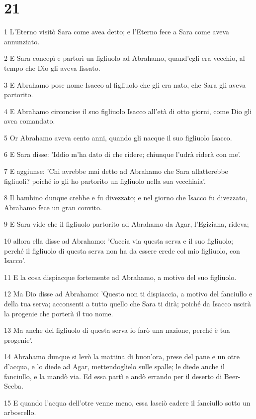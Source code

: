 \chapter{21}

\par 1 L'Eterno visitò Sara come avea detto; e l'Eterno fece a Sara come aveva annunziato.
\par 2 E Sara concepì e partorì un figliuolo ad Abrahamo, quand'egli era vecchio, al tempo che Dio gli aveva fissato.
\par 3 E Abrahamo pose nome Isacco al figliuolo che gli era nato, che Sara gli aveva partorito.
\par 4 E Abrahamo circoncise il suo figliuolo Isacco all'età di otto giorni, come Dio gli avea comandato.
\par 5 Or Abrahamo aveva cento anni, quando gli nacque il suo figliuolo Isacco.
\par 6 E Sara disse: 'Iddio m'ha dato di che ridere; chiunque l'udrà riderà con me'.
\par 7 E aggiunse: 'Chi avrebbe mai detto ad Abrahamo che Sara allatterebbe figliuoli? poiché io gli ho partorito un figliuolo nella sua vecchiaia'.
\par 8 Il bambino dunque crebbe e fu divezzato; e nel giorno che Isacco fu divezzato, Abrahamo fece un gran convito.
\par 9 E Sara vide che il figliuolo partorito ad Abrahamo da Agar, l'Egiziana, rideva;
\par 10 allora ella disse ad Abrahamo: 'Caccia via questa serva e il suo figliuolo; perché il figliuolo di questa serva non ha da essere erede col mio figliuolo, con Isacco'.
\par 11 E la cosa dispiacque fortemente ad Abrahamo, a motivo del suo figliuolo.
\par 12 Ma Dio disse ad Abrahamo: 'Questo non ti dispiaccia, a motivo del fanciullo e della tua serva; acconsenti a tutto quello che Sara ti dirà; poiché da Isacco uscirà la progenie che porterà il tuo nome.
\par 13 Ma anche del figliuolo di questa serva io farò una nazione, perché è tua progenie'.
\par 14 Abrahamo dunque si levò la mattina di buon'ora, prese del pane e un otre d'acqua, e lo diede ad Agar, mettendoglielo sulle spalle; le diede anche il fanciullo, e la mandò via. Ed essa partì e andò errando per il deserto di Beer-Sceba.
\par 15 E quando l'acqua dell'otre venne meno, essa lasciò cadere il fanciullo sotto un arboscello.
